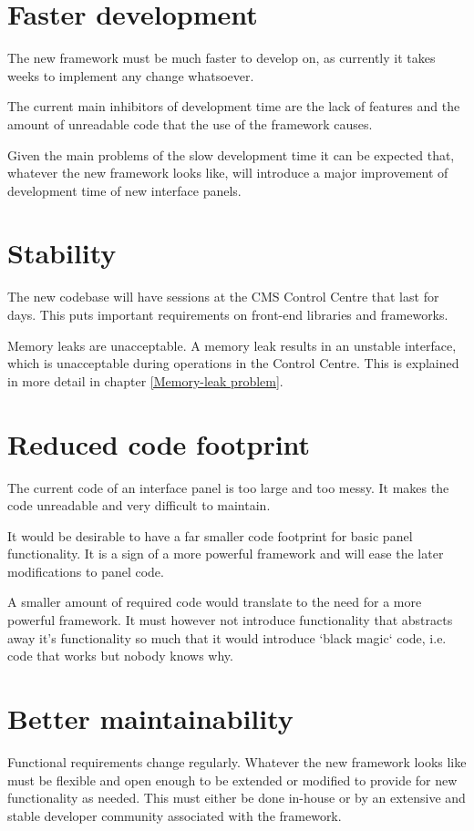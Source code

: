 \section{Faster development}
The new framework must be much faster to develop on, as currently it takes weeks
to implement any change whatsoever.

The current main inhibitors of development time are the lack of features and
the amount of unreadable code that the use of the framework causes.

Given the main problems of the slow development time it can be expected that,
whatever the new framework looks like, will introduce a major improvement of
development time of new interface panels.

\section{Stability}
The new codebase will have sessions at the CMS Control Centre that last for days.
This puts important requirements on front-end libraries and frameworks.

Memory leaks are unacceptable. A memory leak results in an unstable interface,
which is unacceptable during operations in the Control Centre.
This is explained in more detail in chapter \ref{Memory-leak problem}.

\section{Reduced code footprint}
The current code of an interface panel is too large and too messy.
It makes the code unreadable and very difficult to maintain.

It would be desirable to have a far smaller code footprint for basic panel
functionality. It is a sign of a more powerful framework and will ease the
later modifications to panel code.

A smaller amount of required code would translate to the need for a more powerful
framework. It must however not introduce functionality that abstracts
away it's functionality so much that it would introduce `black magic` code, i.e.
code that works but nobody knows why\cite{jargonfile}.

\section{Better maintainability}
Functional requirements change regularly. Whatever the new framework looks like
must be flexible and open enough to be extended or modified to provide for new
functionality as needed. This must either be done in-house or by an extensive and
stable developer community associated with the framework.

